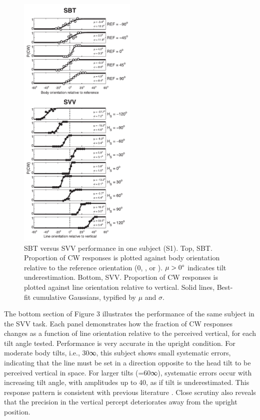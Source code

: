 \begin{figure}
    \includegraphics[width=0.5\textwidth]{src/paper1/figure3.pdf}
    
    \caption{SBT versus SVV performance in one subject (S1). Top, SBT. Proportion of CW responses is plotted against body orientation relative to the reference orientation (0\textdegree, \textdegree, or \textdegree). $\mu > 0\degree$ indicates tilt underestimation. Bottom, SVV. Proportion of CW responses is plotted against line orientation relative to vertical. Solid lines, Best-fit cumulative Gaussians, typified by $\mu$ and $\sigma$.}  
\end{figure}

The bottom section of Figure 3 illustrates the performance of the same subject in the SVV task. Each panel demonstrates how the fraction of CW responses changes as a function of line orientation relative to the perceived vertical, for each tilt angle tested. Performance is very accurate in the upright condition. For moderate body tilts, i.e., 30∞, this subject shows small systematic errors, indicating that the line must be set in a direction opposite to the head tilt to be perceived vertical in space. For larger tilts (=60∞), systematic errors occur with increasing tilt angle, with amplitudes up to 40\textdegree, as if tilt is underestimated. This response pattern is consistent with previous literature \cite{aubert1861, udodehaes1970, mittelstaedt1983, vanbeuzekom2000}. Close scrutiny also reveals that the precision in the vertical percept deteriorates away from the upright position. 


